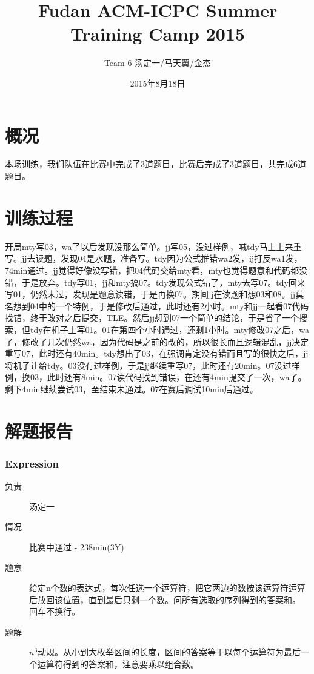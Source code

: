 \documentclass[a4paper, 11pt, nofonts, nocap, fancyhdr]{ctexart}
\title{Fudan ACM-ICPC Summer Training Camp 2015}
\author{Team 6 汤定一/马天翼/金杰}
\date{2015年8月18日}
\newcommand{\problem}[1]{\subsubsection{#1}}
\begin{document}
\maketitle

\section{概况}

本场训练，我们队伍在比赛中完成了3道题目，比赛后完成了3道题目，共完成6道题目。

\section{训练过程}

开局mty写03，wa了以后发现没那么简单。jj写05，没过样例，喊tdy马上上来重写。jj去读题，发现04是水题，准备写。tdy因为公式推错wa2发，ij打反wa1发，74min通过。jj觉得好像没写错，把04代码交给mty看，mty也觉得题意和代码都没错，于是放弃。tdy写01，jj和mty搞07。tdy发现公式错了，mty去写07。tdy回来写01，仍然未过，发现是题意读错，于是再换07。期间jj在读题和想03和08。jj莫名想到04中的一个特例，于是修改后通过，此时还有2小时。mty和jj一起看07代码找错，终于改对之后提交，TLE。然后jj想到07一个简单的结论，于是省了一个搜索，但tdy在机子上写01。01在第四个小时通过，还剩1小时。mty修改07之后，wa了，修改了几次仍然wa，因为代码是之前的改的，所以很长而且逻辑混乱，jj决定重写07，此时还有40min。tdy想出了03，在强调肯定没有错而且写的很快之后，jj将机子让给tdy。03没有过样例，于是jj继续重写07，此时还有20min。07没过样例，换03，此时还有8min。07读代码找到错误，在还有4min提交了一次，wa了。剩下4min继续尝试03，至结束未通过。07在赛后调试10min后通过。

\section{解题报告}

\problem{Expression}

\begin{description}
\item[负责] 汤定一
\item[情况] 比赛中通过 - 238min(3Y)
\item[题意]
给定n个数的表达式，每次任选一个运算符，把它两边的数按该运算符运算后放回该位置，直到最后只剩一个数。问所有选取的序列得到的答案和。
回车不换行。
\item[题解]
$n^3$动规。从小到大枚举区间的长度，区间的答案等于以每个运算符为最后一个运算符得到的答案和，注意要乘以组合数。
\end{description}
\end{document}
